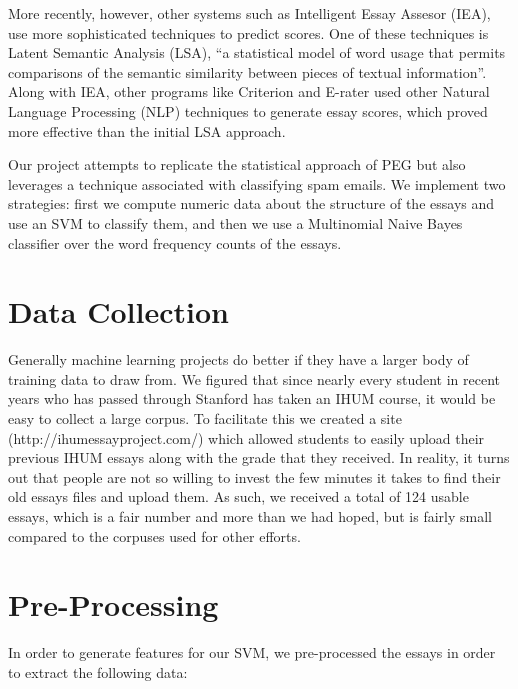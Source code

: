 \documentclass[11pt,acticle]{scrartcl}
\begin{document}
\begin{multicols}{2}
More recently, however, other systems such as Intelligent Essay Assesor (IEA), use more sophisticated techniques to predict scores. One of these techniques is Latent Semantic Analysis (LSA), ``a statistical model of word usage that permits comparisons of the semantic similarity between pieces of textual information''. Along with IEA, other programs like Criterion and E-rater used other Natural Language Processing (NLP) techniques to generate essay scores, which proved more effective than the initial LSA approach.

Our project attempts to replicate the statistical approach of PEG but also leverages a technique associated with classifying spam emails. We implement two strategies: first we compute numeric data about the structure of the essays and use an SVM to classify them, and then we use a Multinomial Naive Bayes classifier over the word frequency counts of the essays.

\section{Data Collection}
Generally machine learning projects do better if they have a larger body of training data to draw from. We figured that since nearly every student in recent years who has passed through Stanford has taken an IHUM course, it would be easy to collect a large corpus. To facilitate this we created a site (http://ihumessayproject.com/) which allowed students to easily upload their previous IHUM essays along with the grade that they received. In reality, it turns out that people are not so willing to invest the few minutes it takes to find their old essays files and upload them. As such, we received a total of 124 usable essays, which is a fair number and more than we had hoped, but is fairly small compared to the corpuses used for other efforts. 

\section{Pre-Processing}
In order to generate features for our SVM, we pre-processed the essays in order to extract the following data:


\end{multicols}
\end{document}
